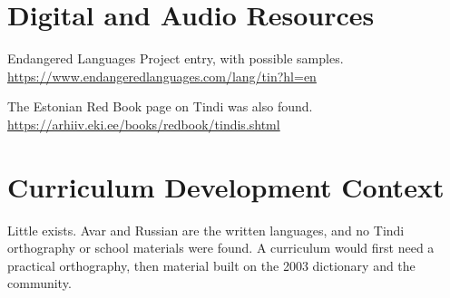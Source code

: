 \documentclass[12pt]{article}
\begin{document}
\section{Digital and Audio Resources}
Endangered Languages Project entry, with possible samples. \url{https://www.endangeredlanguages.com/lang/tin?hl=en}

The Estonian Red Book page on Tindi was also found. \url{https://arhiiv.eki.ee/books/redbook/tindis.shtml}

\section{Curriculum Development Context}
Little exists. Avar and Russian are the written languages, and no Tindi orthography or school materials were found. A curriculum would first need a practical orthography, then material built on the 2003 dictionary and the community.
\end{document}
